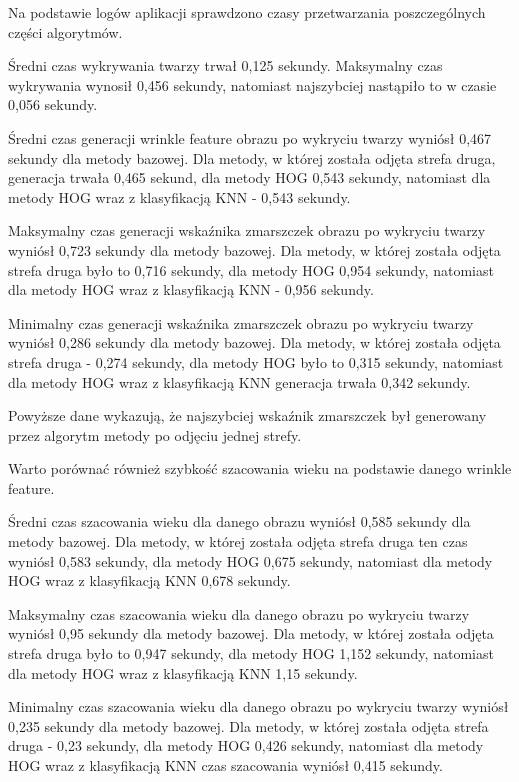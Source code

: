\documentclass[a4paper,twoside,12pt]{book}
\begin{document}
    Na podstawie logów aplikacji sprawdzono czasy przetwarzania poszczególnych części algorytmów.

    Średni czas wykrywania twarzy trwał 0,125 sekundy. Maksymalny czas wykrywania wynosił 0,456 sekundy, natomiast
    najszybciej nastąpiło to w czasie 0,056 sekundy.

    Średni czas generacji wrinkle feature obrazu po wykryciu twarzy wyniósł 0,467 sekundy dla metody bazowej.
    Dla metody, w której została odjęta strefa druga, generacja trwała 0,465 sekund,
    dla metody HOG 0,543 sekundy, natomiast dla metody HOG wraz z klasyfikacją KNN - 0,543 sekundy.

    Maksymalny czas generacji wskaźnika zmarszczek obrazu po wykryciu twarzy wyniósł 0,723 sekundy dla metody bazowej. Dla
    metody, w której została
    odjęta strefa druga było to 0,716 sekundy, dla metody HOG 0,954 sekundy,
    natomiast dla metody HOG wraz z klasyfikacją KNN - 0,956 sekundy.

    Minimalny czas generacji wskaźnika zmarszczek obrazu po wykryciu twarzy wyniósł 0,286 sekundy dla metody bazowej.
    Dla metody, w której została odjęta strefa druga - 0,274 sekundy,
    dla metody HOG było to 0,315 sekundy, natomiast dla metody HOG wraz z klasyfikacją KNN generacja trwała 0,342 sekundy.

    Powyższe dane wykazują, że najszybciej wskaźnik zmarszczek był generowany przez algorytm metody po odjęciu jednej strefy.

    Warto porównać również szybkość szacowania wieku na podstawie danego wrinkle feature.

    Średni czas szacowania wieku dla danego obrazu wyniósł 0,585 sekundy dla metody bazowej.
    Dla metody, w której została
    odjęta strefa druga ten czas wyniósł 0,583 sekundy, dla metody HOG 0,675 sekundy, natomiast dla metody HOG wraz z klasyfikacją KNN 0,678
    sekundy.

    Maksymalny czas szacowania wieku dla danego obrazu po wykryciu twarzy wyniósł 0,95 sekundy dla metody bazowej.
    Dla metody, w której została
    odjęta strefa druga było to 0,947 sekundy, dla metody HOG 1,152 sekundy, natomiast dla metody HOG wraz z klasyfikacją KNN 1,15
    sekundy.

    Minimalny czas szacowania wieku dla danego obrazu po wykryciu twarzy wyniósł 0,235 sekundy dla metody bazowej. Dla
    metody, w której została
    odjęta strefa druga - 0,23 sekundy, dla metody HOG 0,426 sekundy, natomiast dla metody HOG wraz z klasyfikacją KNN czas szacowania wyniósł 0,415
    sekundy.
\end{document}
